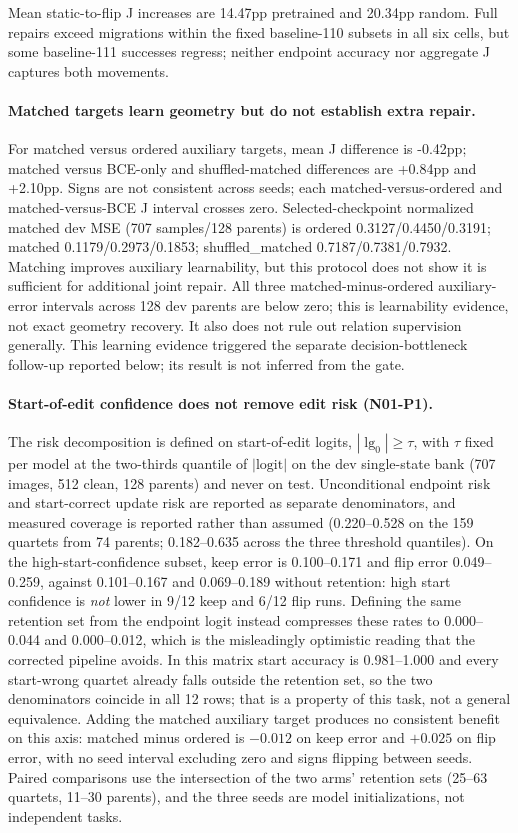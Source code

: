 Mean static-to-flip J increases are 14.47pp pretrained and 20.34pp random. Full repairs exceed migrations within the fixed baseline-110 subsets in all six cells, but some baseline-111 successes regress; neither endpoint accuracy nor aggregate J captures both movements.
\paragraph{Matched targets learn geometry but do not establish extra repair.} For matched versus ordered auxiliary targets, mean J difference is -0.42pp; matched versus BCE-only and shuffled-matched differences are +0.84pp and +2.10pp. Signs are not consistent across seeds; each matched-versus-ordered and matched-versus-BCE J interval crosses zero. Selected-checkpoint normalized matched dev MSE (707 samples/128 parents) is ordered 0.3127/0.4450/0.3191; matched 0.1179/0.2973/0.1853; shuffled\_matched 0.7187/0.7381/0.7932. Matching improves auxiliary learnability, but this protocol does not show it is sufficient for additional joint repair. All three matched-minus-ordered auxiliary-error intervals across 128 dev parents are below zero; this is learnability evidence, not exact geometry recovery. It also does not rule out relation supervision generally. This learning evidence triggered the separate decision-bottleneck follow-up reported below; its result is not inferred from the gate.
\paragraph{Start-of-edit confidence does not remove edit risk (N01-P1).} The risk decomposition is defined on start-of-edit logits, $|\lg_0|\ge\tau$, with $\tau$ fixed per model at the two-thirds quantile of $|\text{logit}|$ on the dev single-state bank (707 images, 512 clean, 128 parents) and never on test. Unconditional endpoint risk and start-correct update risk are reported as separate denominators, and measured coverage is reported rather than assumed (0.220--0.528 on the 159 quartets from 74 parents; 0.182--0.635 across the three threshold quantiles). On the high-start-confidence subset, keep error is 0.100--0.171 and flip error 0.049--0.259, against 0.101--0.167 and 0.069--0.189 without retention: high start confidence is \emph{not} lower in 9/12 keep and 6/12 flip runs. Defining the same retention set from the endpoint logit instead compresses these rates to 0.000--0.044 and 0.000--0.012, which is the misleadingly optimistic reading that the corrected pipeline avoids. In this matrix start accuracy is 0.981--1.000 and every start-wrong quartet already falls outside the retention set, so the two denominators coincide in all 12 rows; that is a property of this task, not a general equivalence. Adding the matched auxiliary target produces no consistent benefit on this axis: matched minus ordered is $-0.012$ on keep error and $+0.025$ on flip error, with no seed interval excluding zero and signs flipping between seeds. Paired comparisons use the intersection of the two arms' retention sets (25--63 quartets, 11--30 parents), and the three seeds are model initializations, not independent tasks.
